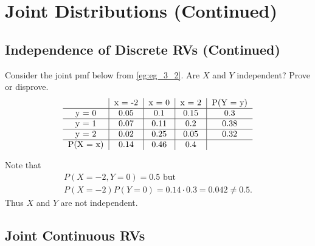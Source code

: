 \documentclass[notoc,notitlepage]{tufte-book}
\begin{document}
\section{Joint Distributions (Continued)}%
\label{sec:joint_distributions_continued}

\subsection{Independence of Discrete RVs (Continued)}%
\label{sub:independence_of_discrete_rvs_continued}

\begin{eg}[Example 3.7]
  Consider the joint pmf below from \cref{eg:eg_3_2}. Are $X$ and $Y$ independent? Prove or disprove.
  \[
  \begin{tabular}{c | c | c | c | c}
             & x = -2 & x = 0 & x = 2 & P(Y = y) \\
    \hline
    y = 0    & 0.05   & 0.1   & 0.15  & 0.3 \\
    \hline
    y = 1    & 0.07   & 0.11  & 0.2   & 0.38 \\
    \hline
    y = 2    & 0.02   & 0.25  & 0.05  & 0.32 \\
    \hline
    P(X = x) & 0.14   & 0.46  & 0.4
  \end{tabular}
  \]

  \begin{solution}
    Note that
    \begin{gather*}
      P(X = -2, Y = 0) = 0.5 \text{ but }\\
      P(X = -2) P(Y = 0) = 0.14 \cdot 0.3 = 0.042 \neq 0.5.
    \end{gather*}
    Thus $X$ and $Y$ are not independent.
  \end{solution}
\end{eg}


\subsection{Joint Continuous RVs}%
\label{sub:joint_continuous_rvs}
\end{document}
